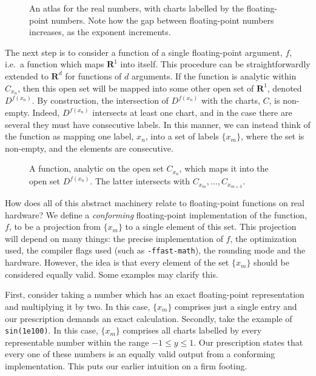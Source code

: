 \documentclass[prd,twocolumn,amsmath,amssymb,nofootinbib,eqsecnum]{revtex4-1}
\newcommand{\code}[1]{{\tt #1}}
\newcommand{\ie}{i.e.}
\begin{document}
\begin{figure}[h]
\begin{center}
\resizebox{25em}{!}{}
\caption{An atlas for the real numbers, with charts labelled by the floating-point numbers. Note how the gap between floating-point numbers increases, as the exponent increments.}
\label{fig:R1}
\end{center}
\end{figure}

The next step is to consider a function of a single floating-point argument, $f$, \ie\ a function which maps $\mathbf{R}^1$ into itself. This procedure can be straightforwardly extended to $\mathbf{R}^d$ for functions of $d$ arguments. If the function is analytic within $C_{x_n}$, then this open set will be mapped into some other open set of $\mathbf{R}^1$, denoted $D^{f(x_n)}$. By construction, the intersection of $D^{f(x_n)}$ with the charts, $C$, is non-empty. Indeed, $D^{f(x_n)}$ intersects at least one chart, and in the case there are several they must have consecutive labels. In this manner, we can instead think of the function as mapping one label, $x_n$, into a set of labels $\{x_{m}\}$, where the set is non-empty, and the elements are consecutive.

\begin{figure}[h]
\begin{center}
\resizebox{25em}{!}{}
\caption{A function, analytic on the open set $C_{x_n}$, which maps it into the open set $D^{f(x_n)}$. The latter intersects with $C_{x_m}, \ldots, C_{x_{m+3}}$.}
\label{fig:R2}
\end{center}
\end{figure}

How does all of this abstract machinery relate to floating-point functions on real hardware? We define a \emph{conforming} floating-point implementation of the function, $f$, to be a projection from $\{x_{m}\}$ to a single element of this set. This projection will depend on many things: the precise implementation of $f$, the optimization used, the compiler flags used (such as \code{-ffast-math}), the rounding mode and the hardware. However, the idea is that every element of the set $\{x_{m}\}$ should be considered equally valid. Some examples may clarify this.

First, consider taking a number which has an exact floating-point representation and multiplying it by two.
In this case, $\{x_{m}\}$ comprises just a single entry and our prescription demands an exact calculation. Secondly, take the example of \code{sin(1e100)}. In this case, $\{x_{m}\}$ comprises all charts labelled by every representable number within the range $-1 \leq y \leq 1$. Our prescription states that every one of these numbers is an equally valid output from a conforming implementation. This puts our earlier intuition on a firm footing.
\end{document}
